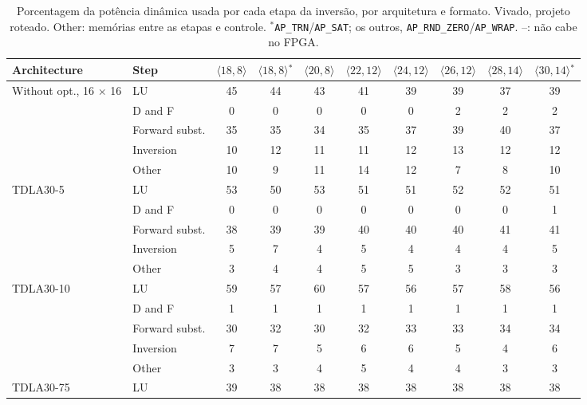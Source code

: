\begin{table}[htbp]
\caption[Porcentagem da potência dinâmica usada por cada etapa da inversão, por arquitetura e formato.]{Porcentagem da potência dinâmica usada por cada etapa da inversão, por arquitetura e formato. Vivado, projeto roteado. Other: memórias entre as etapas e controle. $^{*}$\texttt{AP\_TRN}/\texttt{AP\_SAT}; os outros, \texttt{AP\_RND\_ZERO}/\texttt{AP\_WRAP}. --: não cabe no FPGA.}
\label{tab:etapas-potencia}
\vspace{4pt} %
\centering
\scriptsize
\renewcommand{\arraystretch}{1.05}
\setlength{\tabcolsep}{3pt}
\begin{tabular}{llcccccccc}
\toprule
\textbf{Architecture} & \textbf{Step} & \textbf{$\langle 18,8\rangle$} & \textbf{$\langle 18,8\rangle$$^{*}$} & \textbf{$\langle 20,8\rangle$} & \textbf{$\langle 22,12\rangle$} & \textbf{$\langle 24,12\rangle$} & \textbf{$\langle 26,12\rangle$} & \textbf{$\langle 28,14\rangle$} & \textbf{$\langle 30,14\rangle$$^{*}$} \\
\midrule
\multirow{5}{*}{Without opt., 16 $\times$ 16} & LU & 45 & 44 & 43 & 41 & 39 & 39 & 37 & 39 \\
 & D and F & 0 & 0 & 0 & 0 & 0 & 2 & 2 & 2 \\
 & Forward subst. & 35 & 35 & 34 & 35 & 37 & 39 & 40 & 37 \\
 & Inversion & 10 & 12 & 11 & 11 & 12 & 13 & 12 & 12 \\
 & Other & 10 & 9 & 11 & 14 & 12 & 7 & 8 & 10 \\
\midrule
\multirow{5}{*}{TDLA30-5} & LU & 53 & 50 & 53 & 51 & 51 & 52 & 52 & 51 \\
 & D and F & 0 & 0 & 0 & 0 & 0 & 0 & 0 & 1 \\
 & Forward subst. & 38 & 39 & 39 & 40 & 40 & 40 & 41 & 41 \\
 & Inversion & 5 & 7 & 4 & 5 & 4 & 4 & 4 & 5 \\
 & Other & 3 & 4 & 4 & 5 & 5 & 3 & 3 & 3 \\
\midrule
\multirow{5}{*}{TDLA30-10} & LU & 59 & 57 & 60 & 57 & 56 & 57 & 58 & 56 \\
 & D and F & 1 & 1 & 1 & 1 & 1 & 1 & 1 & 1 \\
 & Forward subst. & 30 & 32 & 30 & 32 & 33 & 33 & 34 & 34 \\
 & Inversion & 7 & 7 & 5 & 6 & 6 & 5 & 4 & 6 \\
 & Other & 3 & 3 & 4 & 5 & 4 & 4 & 3 & 3 \\
\midrule
\multirow{5}{*}{TDLA30-75} & LU & 39 & 38 & 38 & 38 & 38 & 38 & 38 & 38 \\

\end{tabular}
\end{table}
